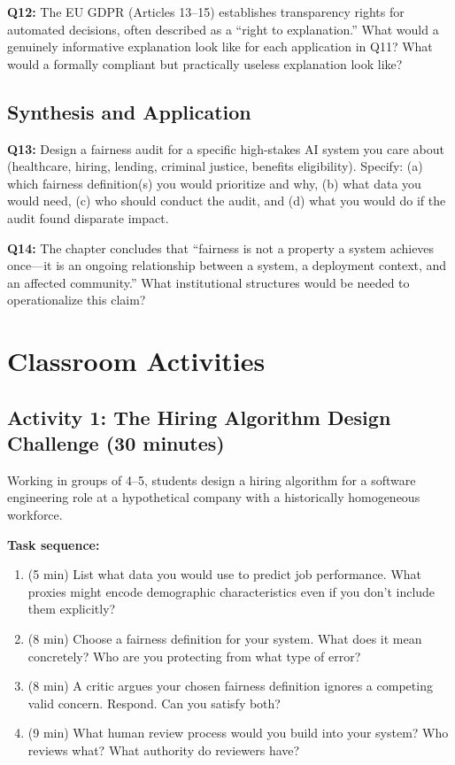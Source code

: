 \textbf{Q12:} The EU GDPR (Articles 13--15) establishes transparency rights for automated decisions, often described as a ``right to explanation.'' What would a genuinely informative explanation look like for each application in Q11? What would a formally compliant but practically useless explanation look like?

\subsection*{Synthesis and Application}

\textbf{Q13:} Design a fairness audit for a specific high-stakes AI system you care about (healthcare, hiring, lending, criminal justice, benefits eligibility). Specify: (a) which fairness definition(s) you would prioritize and why, (b) what data you would need, (c) who should conduct the audit, and (d) what you would do if the audit found disparate impact.

\textbf{Q14:} The chapter concludes that ``fairness is not a property a system achieves once---it is an ongoing relationship between a system, a deployment context, and an affected community.'' What institutional structures would be needed to operationalize this claim?

\section*{Classroom Activities}

\subsection*{Activity 1: The Hiring Algorithm Design Challenge (30 minutes)}

Working in groups of 4--5, students design a hiring algorithm for a software engineering role at a hypothetical company with a historically homogeneous workforce.

\textbf{Task sequence:}
\begin{enumerate}
    \item (5 min) List what data you would use to predict job performance. What proxies might encode demographic characteristics even if you don't include them explicitly?
    \item (8 min) Choose a fairness definition for your system. What does it mean concretely? Who are you protecting from what type of error?
    \item (8 min) A critic argues your chosen fairness definition ignores a competing valid concern. Respond. Can you satisfy both?
    \item (9 min) What human review process would you build into your system? Who reviews what? What authority do reviewers have?
\end{enumerate}

